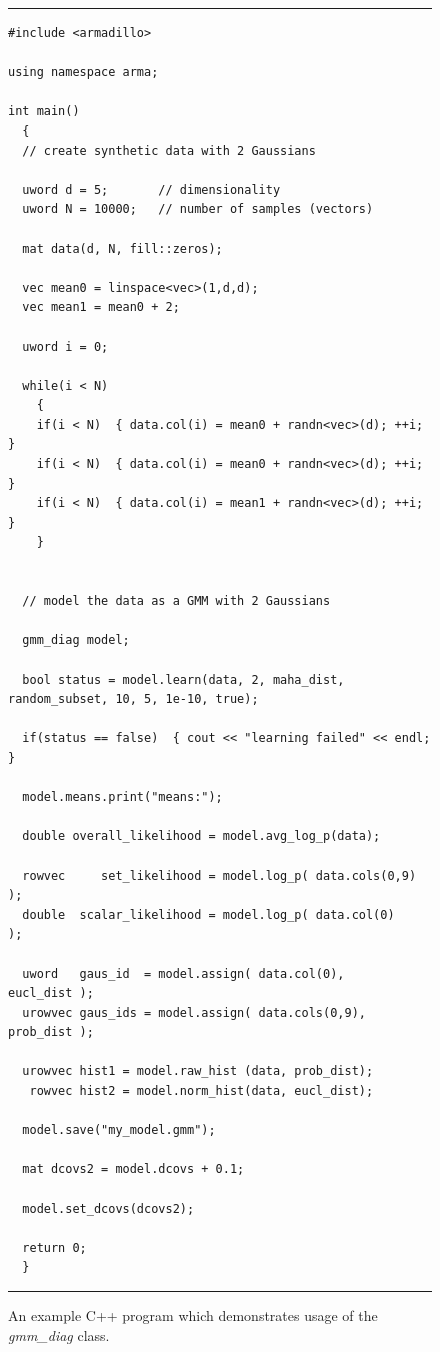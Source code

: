 \begin{figure}
\hrule
\vspace{1ex}
\centering
\begin{Verbatim}[fontfamily=fvm,fontsize=\footnotesize]
#include <armadillo>

using namespace arma;

int main()
  {
  // create synthetic data with 2 Gaussians
  
  uword d = 5;       // dimensionality
  uword N = 10000;   // number of samples (vectors)
  
  mat data(d, N, fill::zeros);
  
  vec mean0 = linspace<vec>(1,d,d);
  vec mean1 = mean0 + 2;
  
  uword i = 0;
  
  while(i < N)
    {
    if(i < N)  { data.col(i) = mean0 + randn<vec>(d); ++i; }
    if(i < N)  { data.col(i) = mean0 + randn<vec>(d); ++i; }
    if(i < N)  { data.col(i) = mean1 + randn<vec>(d); ++i; }
    }
  
  
  // model the data as a GMM with 2 Gaussians
  
  gmm_diag model;
  
  bool status = model.learn(data, 2, maha_dist, random_subset, 10, 5, 1e-10, true);
  
  if(status == false)  { cout << "learning failed" << endl; }
  
  model.means.print("means:");
  
  double overall_likelihood = model.avg_log_p(data);
  
  rowvec     set_likelihood = model.log_p( data.cols(0,9) );
  double  scalar_likelihood = model.log_p( data.col(0)    );
  
  uword   gaus_id  = model.assign( data.col(0),    eucl_dist );
  urowvec gaus_ids = model.assign( data.cols(0,9), prob_dist );
  
  urowvec hist1 = model.raw_hist (data, prob_dist);
   rowvec hist2 = model.norm_hist(data, eucl_dist);
  
  model.save("my_model.gmm");
  
  mat dcovs2 = model.dcovs + 0.1;
  
  model.set_dcovs(dcovs2);
  
  return 0;
  }
\end{Verbatim}
\vspace{-1ex}
\hrule
\vspace{0.5ex}
\caption
  {
  An example C++ program which demonstrates usage of the {\it gmm\_diag} class.
  }
\label{fig:example_usage}
\end{figure}
